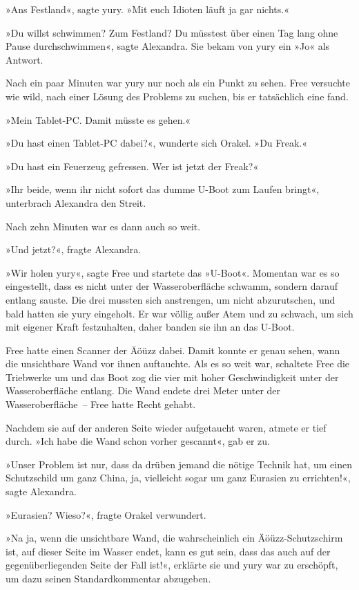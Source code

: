 »Ans Festland«, sagte yury. »Mit euch Idioten läuft ja gar nichts.«

»Du willst schwimmen? Zum Festland? Du müsstest über einen Tag lang ohne Pause durchschwimmen«, sagte Alexandra. Sie bekam von yury ein »Jo« als Antwort.

Nach ein paar Minuten war yury nur noch als ein Punkt zu sehen. Free versuchte wie wild, nach einer Lösung des Problems zu suchen, bis er tatsächlich eine fand.

»Mein Tablet-PC. Damit müsste es gehen.«

»Du hast einen Tablet-PC dabei?«, wunderte sich Orakel. »Du Freak.«

»Du hast ein Feuerzeug gefressen. Wer ist jetzt der Freak?«

»Ihr beide, wenn ihr nicht sofort das dumme U-Boot zum Laufen bringt«, unterbrach Alexandra den Streit.

Nach zehn Minuten war es dann auch so weit.

»Und jetzt?«, fragte Alexandra.

»Wir holen yury«, sagte Free und startete das »U-Boot«. Momentan war es so eingestellt, dass es nicht unter der Wasseroberfläche schwamm, sondern darauf entlang sauste. Die drei mussten sich anstrengen, um nicht abzurutschen, und bald hatten sie yury eingeholt. Er war völlig außer Atem und zu schwach, um sich mit eigener Kraft festzuhalten, daher banden sie ihn an das U-Boot.

Free hatte einen Scanner der Äöüzz dabei. Damit konnte er genau sehen, wann die unsichtbare Wand vor ihnen auftauchte. Als es so weit war, schaltete Free die Triebwerke um und das Boot zog die vier mit hoher Geschwindigkeit unter der Wasseroberfläche entlang. Die Wand endete drei Meter unter der Wasseroberfläche~– Free hatte Recht gehabt.

Nachdem sie auf der anderen Seite wieder aufgetaucht waren, atmete er tief durch. »Ich habe die Wand schon vorher gescannt«, gab er zu.

»Unser Problem ist nur, dass da drüben jemand die nötige Technik hat, um einen Schutzschild um ganz China, ja, vielleicht sogar um ganz Eurasien zu errichten!«, sagte Alexandra.

»Eurasien? Wieso?«, fragte Orakel verwundert.

»Na ja, wenn die unsichtbare Wand, die wahrscheinlich ein Äöüzz-Schutzschirm ist, auf dieser Seite im Wasser endet, kann es gut sein, dass das auch auf der gegenüberliegenden Seite der Fall ist!«, erklärte sie und yury war zu erschöpft, um dazu seinen Standardkommentar abzugeben.

